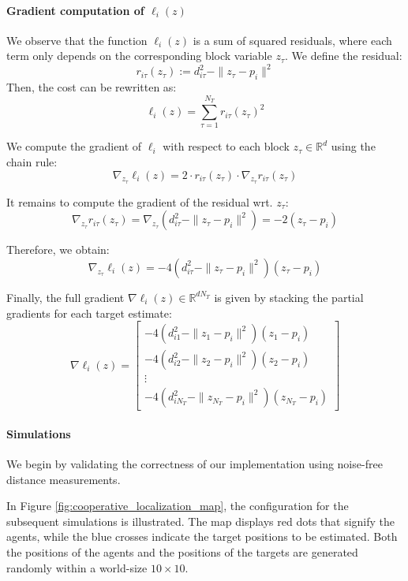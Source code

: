 \paragraph{Gradient computation of $\ell_i(z)$}
We observe that the function $\ell_i(z)$ is a sum of squared residuals, where each term only depends on the corresponding block variable $z_\tau$. We define the residual:
\[
r_{i\tau}(z_\tau) := d_{i\tau}^2 - \| z_\tau - p_i \|^2
\]
Then, the cost can be rewritten as:
\[
\ell_i(z) = \sum_{\tau=1}^{N_T} r_{i\tau}(z_\tau)^2
\]

We compute the gradient of $\ell_i$ with respect to each block $z_\tau \in \mathbb{R}^d$ using the chain rule:
\[
\nabla_{z_\tau}\ell_i(z) = 2 \cdot r_{i\tau}(z_\tau) \cdot \nabla_{z_\tau} r_{i\tau}(z_\tau)
\]

It remains to compute the gradient of the residual wrt. $z_\tau$:
\[
\nabla_{z_\tau} r_{i\tau}(z_\tau) = \nabla_{z_\tau} \left( d_{i\tau}^2 - \| z_\tau - p_i \|^2 \right) = -2(z_\tau - p_i)
\]

Therefore, we obtain:
\[
\nabla_{z_\tau} \ell_i(z) = -4 \left( d_{i\tau}^2 - \| z_\tau - p_i \|^2 \right) (z_\tau - p_i)
\]

\vspace{1em}

Finally, the full gradient $\nabla \ell_i(z) \in \mathbb{R}^{d N_T}$ is given by stacking the partial gradients for each target estimate:
\[
\nabla \ell_i(z) = 
\begin{bmatrix}
-4 \left( d_{i1}^2 - \| z_1 - p_i \|^2 \right)(z_1 - p_i) \\
-4 \left( d_{i2}^2 - \| z_2 - p_i \|^2 \right)(z_2 - p_i) \\
\vdots \\
-4 \left( d_{iN_T}^2 - \| z_{N_T} - p_i \|^2 \right)(z_{N_T} - p_i)
\end{bmatrix}
\]

\medskip

\paragraph{Simulations}
We begin by validating the correctness of our implementation using noise-free distance measurements.

In Figure \ref{fig:cooperative_localization_map}, the configuration for the subsequent simulations is illustrated. The map displays red dots that signify the agents, while the blue crosses indicate the target positions to be estimated. Both the positions of the agents and the positions of the targets are generated randomly within a world-size $10\times10$.

